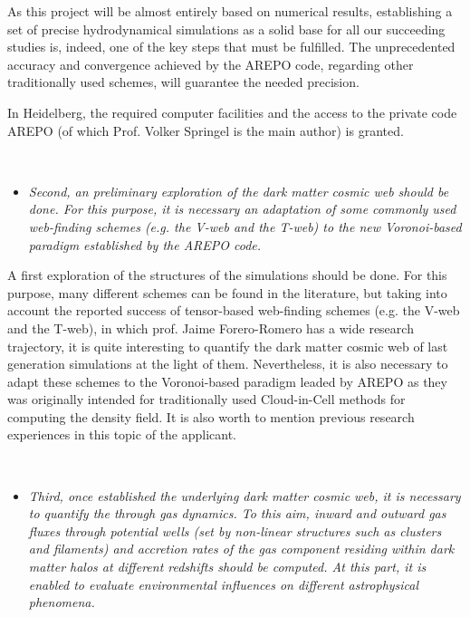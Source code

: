 \documentclass[a4,useAMS,usenatbib,usegraphicx,12pt]{article}
\begin{document}
As this project will be almost entirely based on numerical results, establishing
a set of precise hydrodynamical simulations as a solid base for all our succeeding
studies is, indeed, one of the key steps that must be fulfilled. The unprecedented 
accuracy and convergence achieved by the AREPO code, regarding other traditionally 
used schemes, will guarantee the needed precision.


In Heidelberg, the required computer facilities and the access to the private 
code AREPO (of which Prof. Volker Springel is the main author) is granted.

\

\begin{itemize}

\item[\checkmark] \textit{Second, an preliminary exploration of the dark matter 
cosmic web should be done. For this purpose, it is necessary an adaptation of 
some commonly used web-finding schemes (e.g. the V-web and the T-web) to the 
new Voronoi-based paradigm established by the AREPO code.}

\end{itemize}


A first exploration of the structures of the simulations should be done. For 
this purpose, many different schemes can be found in the literature, 
but taking into account the reported success of tensor-based 
web-finding schemes (e.g. the V-web and the T-web), in which prof. Jaime 
Forero-Romero has a wide research trajectory, it is quite interesting to 
quantify the dark matter cosmic web of last generation simulations at the light 
of them. Nevertheless, it is also necessary to adapt these schemes to the 
Voronoi-based paradigm leaded by AREPO as they was originally intended for 
traditionally used Cloud-in-Cell methods for computing the density field.
It is also worth to mention previous research experiences in this topic of the
applicant.

\

\begin{itemize}

\item[\checkmark] \textit{Third, once established the underlying dark matter 
cosmic web, it is necessary to quantify the through gas dynamics. To this aim, 
inward and outward gas fluxes through potential wells (set by non-linear 
structures such as clusters and filaments) and accretion rates of the gas 
component residing within dark matter halos at different redshifts should be 
computed. At this part, it is enabled to evaluate environmental influences on
different astrophysical phenomena. }

\end{itemize}
\end{document}
